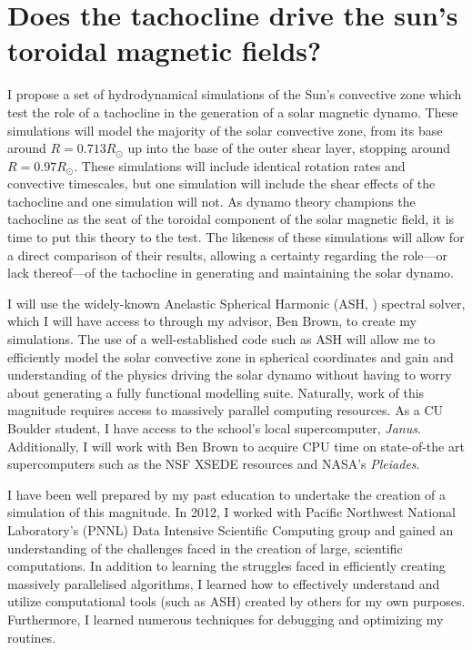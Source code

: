 \documentclass[aasms,12pt]{article}
\begin{document}
\section{Does the tachocline drive the sun's toroidal magnetic fields?}
I propose a set of hydrodynamical simulations of the Sun's convective zone
which test the role of a tachocline in the generation of a solar magnetic 
dynamo.  These simulations will model the majority of the solar convective
zone, from its base around $R = 0.713R_{\odot}$ up into the base of the outer
shear layer, stopping
around $R = 0.97R_{\odot}$.  These simulations will include identical rotation
rates and convective timescales, but one simulation will include the shear
effects of the tachocline and one simulation will not.
As dynamo theory champions the tachocline as the seat of the toroidal component
of the solar magnetic field, it is time to put this theory to the test.
The likeness of these simulations will allow for a direct comparison of their
results, allowing a certainty regarding the role---or lack thereof---of the
tachocline in generating and maintaining the solar dynamo.

I will use the widely-known Anelastic Spherical Harmonic (ASH, 
\citealt{clune1999}) spectral solver, which I will have access to through my
advisor, Ben Brown, to create my simulations.  The use of a well-established
code such as ASH will allow me to
efficiently model the solar convective zone in spherical coordinates and gain
and understanding of the physics driving the solar dynamo without having to
worry about generating a fully functional modelling suite.  Naturally, work
of this magnitude requires access to massively parallel computing resources.
As a CU Boulder student, I have access to the school's local supercomputer,
\emph{Janus}.  Additionally, I will work with Ben Brown to acquire CPU time on
state-of-the art supercomputers such as the NSF XSEDE resources and NASA's
\emph{Pleiades}. 

I have been well prepared by my past education to undertake the creation of
a simulation of this magnitude.  
In 2012, I worked with
Pacific Northwest National Laboratory's (PNNL) Data Intensive Scientific
Computing group and gained an understanding of the challenges faced in the
creation of large, scientific computations.  In addition to learning the
struggles faced in efficiently creating massively parallelised algorithms,
I learned how to effectively understand and utilize computational tools
(such as ASH) created by others for my own purposes. Furthermore, I learned
numerous techniques for debugging and optimizing my routines.
\end{document}
